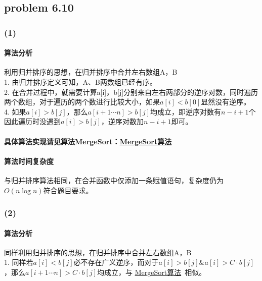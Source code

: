 \documentclass[11pt]{ctexart}
\begin{document}
	\subsection*{problem 6.10}
	\subsubsection*{(1)}
	\paragraph{算法分析}利用归并排序的思想，在归并排序中合并左右数组A，B\\
	\hspace*{20pt}1. 由归并排序定义可知，A、B两数组已经有序。\\
	\hspace*{20pt}2. 在合并过程中，就需要计算a[i]，b[j]分别来自左右两部分的逆序对数，同时遍历两个数组，对于遍历的两个数进行比较大小，如果$a[i]<b[0]$显然没有逆序。\\
	\hspace*{20pt}4. 如果$a[i]>b[j]$，那么$a[i+1\cdots n]>b[j]$均成立，即逆序对数有$n-i+1$个
	因此遍历时没遇到$a[i]>b[j]$，逆序对数加$n-i+1$即可。
	\paragraph{具体算法实现请见算法MergeSort：\hyperref[MergeSort算法]{MergeSort算法}}
	\paragraph{算法时间复杂度}与归并排序算法相同，在合并函数中仅添加一条赋值语句，复杂度仍为$O(n\log n)$符合题目要求。
	\subsubsection*{(2)}
	\paragraph{算法分析}同样利用归并排序的思想，在归并排序中合并左右数组A，B\\
	\hspace*{20pt}1. 同样若$a[i]<b[j]$必不存在广义逆序，而对于$a[i]>b[j]\&a[i]>C\cdot b[j]$，那么$a[i+1\cdots n]>C\cdot b[j]$均成立，与 \hyperref[MergeSort算法]{MergeSort算法}\ 相似。
\end{document}

